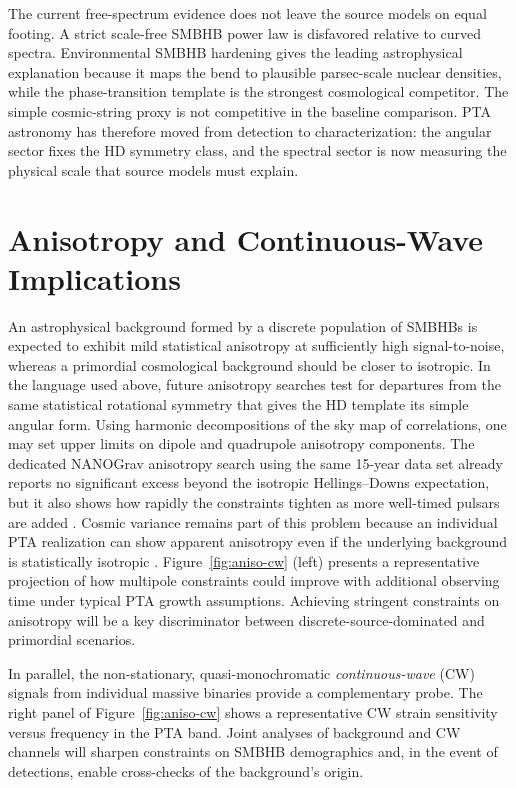 \documentclass[symmetry,article,submit,pdftex,moreauthors]{Definitions/mdpi}
\begin{document}
The current free-spectrum evidence does not leave the source models on equal footing. A strict scale-free SMBHB power law is disfavored relative to curved spectra. Environmental SMBHB hardening gives the leading astrophysical explanation because it maps the bend to plausible parsec-scale nuclear densities, while the phase-transition template is the strongest cosmological competitor. The simple cosmic-string proxy is not competitive in the baseline comparison. PTA astronomy has therefore moved from detection to characterization: the angular sector fixes the HD symmetry class, and the spectral sector is now measuring the physical scale that source models must explain.

\section{Anisotropy and Continuous-Wave Implications}\label{sec:anisotropy}
An astrophysical background formed by a discrete population of SMBHBs is expected to exhibit mild statistical anisotropy at sufficiently high signal-to-noise, whereas a primordial cosmological background should be closer to isotropic. In the language used above, future anisotropy searches test for departures from the same statistical rotational symmetry that gives the HD template its simple angular form. Using harmonic decompositions of the sky map of correlations, one may set upper limits on dipole and quadrupole anisotropy components. The dedicated NANOGrav anisotropy search using the same 15-year data set already reports no significant excess beyond the isotropic Hellings--Downs expectation, but it also shows how rapidly the constraints tighten as more well-timed pulsars are added \cite{Agazie2023Anisotropy}. Cosmic variance remains part of this problem because an individual PTA realization can show apparent anisotropy even if the underlying background is statistically isotropic \cite{Domcke2025CosmicVariance}. Figure~\ref{fig:aniso-cw} (left) presents a representative projection of how multipole constraints could improve with additional observing time under typical PTA growth assumptions. Achieving stringent constraints on anisotropy will be a key discriminator between discrete-source-dominated and primordial scenarios.

In parallel, the non-stationary, quasi-monochromatic \emph{continuous-wave} (CW) signals from individual massive binaries provide a complementary probe. The right panel of Figure~\ref{fig:aniso-cw} shows a representative CW strain sensitivity versus frequency in the PTA band. Joint analyses of background and CW channels will sharpen constraints on SMBHB demographics and, in the event of detections, enable cross-checks of the background’s origin.
\end{document}
